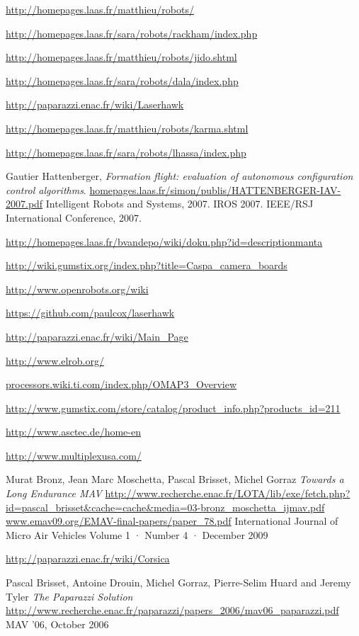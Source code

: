 \documentclass[a4paper,11pt]{report}
\begin{document}
\begin{thebibliography}{9}

  \url{http://homepages.laas.fr/matthieu/robots/}


  \url{http://homepages.laas.fr/sara/robots/rackham/index.php}

  \url{http://homepages.laas.fr/matthieu/robots/jido.shtml}

  \url{http://homepages.laas.fr/sara/robots/dala/index.php}

  \url{http://paparazzi.enac.fr/wiki/Laserhawk}

  \url{http://homepages.laas.fr/matthieu/robots/karma.shtml}

  \url{http://homepages.laas.fr/sara/robots/lhassa/index.php}

  Gautier Hattenberger,
  \emph{Formation flight: evaluation of autonomous configuration control algorithms}.
  \url{homepages.laas.fr/simon/publis/HATTENBERGER-IAV-2007.pdf}
  Intelligent Robots and Systems, 2007. IROS 2007. IEEE/RSJ International Conference, 
  2007.

  \url{http://homepages.laas.fr/bvandepo/wiki/doku.php?id=descriptionmanta}

  \url{http://wiki.gumstix.org/index.php?title=Caspa_camera_boards}

  \url{http://www.openrobots.org/wiki}

  \url{https://github.com/paulcox/laserhawk}

  \url{http://paparazzi.enac.fr/wiki/Main_Page}

  \url{http://www.elrob.org/}

  \url{processors.wiki.ti.com/index.php/OMAP3_Overview}

  \url{http://www.gumstix.com/store/catalog/product_info.php?products_id=211}

  \url{http://www.asctec.de/home-en}

  \url{http://www.multiplexusa.com/}

  Murat Bronz, Jean Marc Moschetta, Pascal Brisset, Michel Gorraz
  \emph{Towards a Long Endurance MAV}
  \url{http://www.recherche.enac.fr/LOTA/lib/exe/fetch.php?id=pascal_brisset&cache=cache&media=03-bronz_moschetta_ijmav.pdf}
  \url{www.emav09.org/EMAV-final-papers/paper_78.pdf}
  International Journal of Micro Air Vehicles
  Volume 1 · Number 4 · December 2009

  \url{http://paparazzi.enac.fr/wiki/Corsica}

  Pascal Brisset, Antoine Drouin, Michel Gorraz, Pierre-Selim Huard and Jeremy Tyler
  \emph{The Paparazzi Solution}
  \url{http://www.recherche.enac.fr/paparazzi/papers_2006/mav06_paparazzi.pdf}
  MAV '06,
  October 2006

\end{thebibliography}
\end{document}

